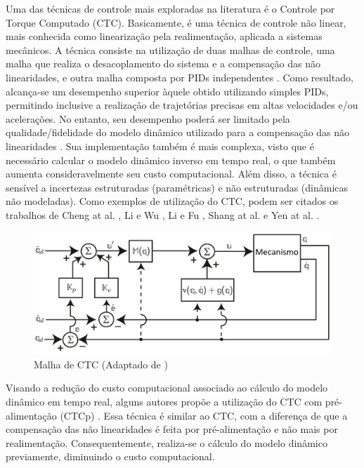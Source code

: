 \documentclass[]{politex}
\begin{document}
Uma das técnicas de controle mais exploradas na literatura é o Controle por Torque Computado (CTC). Basicamente, é uma técnica de controle não linear, mais conhecida como linearização pela realimentação, aplicada a sistemas mecânicos. A técnica consiste na utilização de duas malhas de controle, uma malha que realiza o desacoplamento do sistema e a compensação das não linearidades, e outra malha composta por PIDs independentes \cite{Craig}. Como resultado, alcança-se um desempenho  superior  àquele obtido utilizando simples PIDs, permitindo inclusive a realização de trajetórias precisas em altas velocidades e/ou acelerações. No entanto, seu desempenho poderá ser limitado pela qualidade/fidelidade do modelo dinâmico utilizado para a compensação das não linearidades \cite{SlotiniSMC}. Sua implementação também é mais complexa, visto que é necessário calcular o modelo dinâmico inverso em tempo real, o que também aumenta consideravelmente seu custo computacional. Além disso, a técnica é sensível a incertezas estruturadas (paramétricas) e não estruturadas (dinâmicas não modeladas). Como exemplos de utilização do CTC, podem ser citados os trabalhos de Cheng at al. \cite{Cheng}, Li e Wu \cite{Li}, Li e Fu \cite{Li2}, Shang at al. \cite{Shang} e Yen at al. \cite{Yen}.

\begin{figure}[h]
	\centering
	\includegraphics[scale=0.385]{../figures/CTC.jpg}  
	\caption{Malha de CTC (Adaptado de \cite{Craig})}
	\label{fig:CTC}
\end{figure}

Visando a redução do custo computacional associado ao cálculo do modelo dinâmico em tempo real, alguns autores propõe a utilização do CTC com pré-alimentação (CTCp) \cite{Khalil, Siciliano, Spong}. Essa técnica é similar ao CTC, com a diferença de que a compensação das não linearidades é feita por pré-alimentação e não mais por realimentação.  Consequentemente, realiza-se o cálculo do modelo dinâmico previamente, diminuindo o custo computacional.
\end{document}
